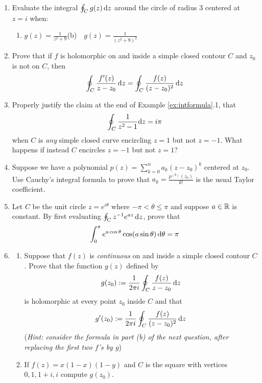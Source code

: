 \begin{exercises*}
\begin{enumerate}
	  
	  \item Evaluate the integral $\oint_C g(z)\,{\mathrm{d} z}$ around the circle of radius 3 centered at $z=i$ when:
	  \begin{enumerate}
	    \item $\displaystyle g(z)=\frac 1{z^2+9}$\qquad (b)\ \ $\displaystyle g(z)=\frac 1{(z^2+9)^2}$
	  \end{enumerate} 
	  
	  
	  \item Prove that if $f$ is holomorphic on and inside a simple closed contour $C$ and $z_0$ is not on $C$, then
	  \[
	  	\oint_C\frac{f'(z)}{z-z_0}\,{\mathrm{d} z} =\oint_C\frac{f(z)}{(z-z_0)^2}\,{\mathrm{d} z}
	  \]
	  
	  
	  \item Properly justify the claim at the end of Example \ref{ex:intformula}.1, that
	  \[
	  	\oint_{C}\frac{1}{z^2-1}{\mathrm{d} z}=i\pi
	  \]
	  when $C$ is \emph{any} simple closed curve encircling $z=1$ but not $z=-1$. What happens if instead $C$ encircles $z=-1$ but not $z=1$?
	  
	  
	  \item Suppose we have a polynomial $p(z)=\sum\limits_{k=0}^na_k(z-z_0)^k$ centered at $z_0$.
	  Use Cauchy's integral formula to prove that $a_k=\frac{p^{(k)}(z_0)}{k!}$ is the usual Taylor coefficient.
	  
	  
	  \item Let $C$ be the unit circle $z=e^{i\theta}$ where $-\pi<\theta\le\pi$ and suppose $a\in\mathbb{R}$ is constant. By first evaluating $\oint_Cz^{-1}e^{az}\,{\mathrm{d} z}$, prove that
	  \[
	  	\int_0^\pi e^{a\cos\theta}\cos(a\sin\theta)\,{\mathrm{d}\theta}=\pi
	  \] 
		
		  
	  \item\begin{enumerate}
	     \item Suppose that $f(z)$ is \emph{continuous} on and inside a simple closed contour $C$. Prove that the function $g(z)$ defined by
	    \[
	    	g(z_0):=\frac 1{2\pi i}\oint_C\frac{f(z)}{z-z_0}\,{\mathrm{d} z}
	    \]
	    is holomorphic at every point $z_0$ inside $C$ and that
	    \[
	    	g'(z_0):=\frac 1{2\pi i}\oint_C\frac{f(z)}{(z-z_0)^2}\,{\mathrm{d} z}
	    \]
	    (\emph{Hint: consider the formula in part (b) of the next question, after replacing the first two $f$'s by $g$})
	    
	    \item If $f(z)=x(1-x)(1-y)$ and $C$ is the square with vertices $0,1,1+i,i$ compute $g(z_0)$.
	  \end{enumerate}
	

\end{enumerate}
\end{exercises*}

